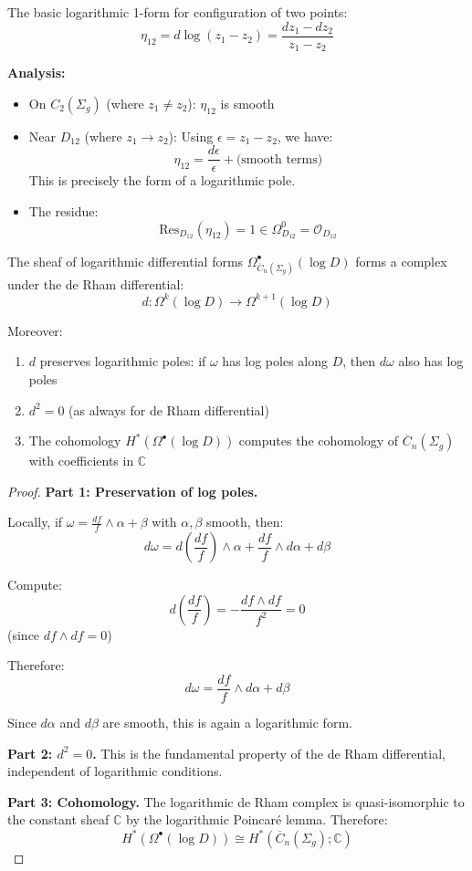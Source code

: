 \begin{example}\label{ex:log-form-two-points}
The basic logarithmic 1-form for configuration of two points:
$$\eta_{12} = d\log(z_1 - z_2) = \frac{dz_1 - dz_2}{z_1 - z_2}$$

\textbf{Analysis:}
\begin{itemize}
\item On $C_2(\Sigma_g)$ (where $z_1 \neq z_2$): $\eta_{12}$ is smooth
\item Near $D_{12}$ (where $z_1 \to z_2$): Using $\epsilon = z_1 - z_2$, we have:
$$\eta_{12} = \frac{d\epsilon}{\epsilon} + \text{(smooth terms)}$$
This is precisely the form of a logarithmic pole.
\item The residue:
$$\text{Res}_{D_{12}}(\eta_{12}) = 1 \in \Omega^0_{D_{12}} = \mathcal{O}_{D_{12}}$$
\end{itemize}
\end{example}

\begin{theorem}\label{thm:log-complex}
The sheaf of logarithmic differential forms $\Omega^\bullet_{\overline{C}_n(\Sigma_g)}(\log D)$ forms a complex under the de Rham differential:
$$d: \Omega^k(\log D) \to \Omega^{k+1}(\log D)$$

Moreover:
\begin{enumerate}
\item $d$ preserves logarithmic poles: if $\omega$ has log poles along $D$, then $d\omega$ also has log poles
\item $d^2 = 0$ (as always for de Rham differential)
\item The cohomology $H^*(\Omega^\bullet(\log D))$ computes the cohomology of $\overline{C}_n(\Sigma_g)$ with coefficients in $\mathbb{C}$
\end{enumerate}
\end{theorem}

\begin{proof}
\textbf{Part 1: Preservation of log poles.}

Locally, if $\omega = \frac{df}{f} \wedge \alpha + \beta$ with $\alpha, \beta$ smooth, then:
$$d\omega = d\left(\frac{df}{f}\right) \wedge \alpha + \frac{df}{f} \wedge d\alpha + d\beta$$

Compute:
$$d\left(\frac{df}{f}\right) = -\frac{df \wedge df}{f^2} = 0$$
(since $df \wedge df = 0$)

Therefore:
$$d\omega = \frac{df}{f} \wedge d\alpha + d\beta$$

Since $d\alpha$ and $d\beta$ are smooth, this is again a logarithmic form.

\textbf{Part 2: $d^2 = 0$.}
This is the fundamental property of the de Rham differential, independent of logarithmic conditions.

\textbf{Part 3: Cohomology.}
The logarithmic de Rham complex is quasi-isomorphic to the constant sheaf $\mathbb{C}$ by the logarithmic Poincaré lemma. Therefore:
$$H^*(\Omega^\bullet(\log D)) \cong H^*(\overline{C}_n(\Sigma_g); \mathbb{C})$$
\end{proof}

